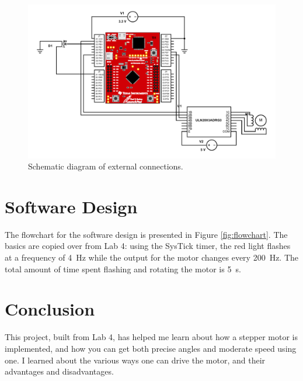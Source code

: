 \documentclass{article}
\begin{document}
\begin{figure}[H]
    \centering
    \includegraphics[width=\textwidth]{Images/schemeit-project}
    \caption{Schematic diagram of external connections.}
    \label{schematic}
\end{figure}

\section{Software Design} The flowchart for the software design
is presented in Figure \ref{fig:flowchart}. The basics are
copied over from Lab 4: using the SysTick timer, the
red light flashes at a frequency of \SI{4}{\hertz} while
the output for the motor changes every \SI{200}{Hz}. The
total amount of time spent flashing and rotating the motor
is \SI{5}{\second}. 

\section{Conclusion} This project, built from Lab 4, has helped
me learn about how a stepper motor is implemented, and how
you can get both precise angles and moderate speed using one.
I learned about the various ways one can drive the motor,
and their advantages and disadvantages.
\end{document}
